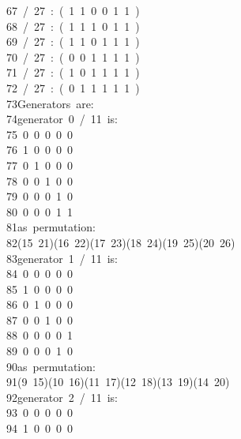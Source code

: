 \begin{tabbing}
67\ /\ 27\ :\ (\ 1\ 1\ 0\ 0\ 1\ 1\ )\\[0pt]
68\ /\ 27\ :\ (\ 1\ 1\ 1\ 0\ 1\ 1\ )\\[0pt]
69\ /\ 27\ :\ (\ 1\ 1\ 0\ 1\ 1\ 1\ )\\[0pt]
70\ /\ 27\ :\ (\ 0\ 0\ 1\ 1\ 1\ 1\ )\\[0pt]
71\ /\ 27\ :\ (\ 1\ 0\ 1\ 1\ 1\ 1\ )\\[0pt]
72\ /\ 27\ :\ (\ 0\ 1\ 1\ 1\ 1\ 1\ )\\[0pt]
73\>Generators\ are:\\[0pt]
74\>generator\ 0\ /\ 11\ is:\ \\[0pt]
75\ 0\ 0\ 0\ 0\ 0\ \\[0pt]
76\ 1\ 0\ 0\ 0\ 0\ \\[0pt]
77\ 0\ 1\ 0\ 0\ 0\ \\[0pt]
78\ 0\ 0\ 1\ 0\ 0\ \\[0pt]
79\ 0\ 0\ 0\ 1\ 0\ \\[0pt]
80\ 0\ 0\ 0\ 1\ 1\ \\[0pt]
81\>as\ permutation:\ \\[0pt]
82\>(15\ 21)(16\ 22)(17\ 23)(18\ 24)(19\ 25)(20\ 26)\\[0pt]
83\>generator\ 1\ /\ 11\ is:\ \\[0pt]
84\ 0\ 0\ 0\ 0\ 0\ \\[0pt]
85\ 1\ 0\ 0\ 0\ 0\ \\[0pt]
86\ 0\ 1\ 0\ 0\ 0\ \\[0pt]
87\ 0\ 0\ 1\ 0\ 0\ \\[0pt]
88\ 0\ 0\ 0\ 0\ 1\ \\[0pt]
89\ 0\ 0\ 0\ 1\ 0\ \\[0pt]
90\>as\ permutation:\ \\[0pt]
91\>(9\ 15)(10\ 16)(11\ 17)(12\ 18)(13\ 19)(14\ 20)\\[0pt]
92\>generator\ 2\ /\ 11\ is:\ \\[0pt]
93\ 0\ 0\ 0\ 0\ 0\ \\[0pt]
94\ 1\ 0\ 0\ 0\ 0\ \\[0pt]

\end{tabbing}
